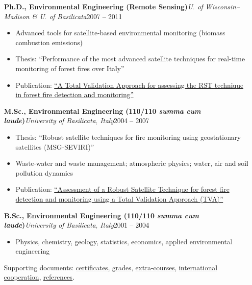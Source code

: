 \documentclass[10pt,a4paper]{article}
\newcommand{\role}[3]{%
  \textbf{#1}\hfill\textcolor{accent}{\textit{#2}}\hfill{#3}\par\vspace{0.15em}}
\begin{document}
\role{Ph.D., Environmental Engineering (Remote Sensing)}{U. of Wisconsin--Madison \& U. of Basilicata}{2007 -- 2011}
\begin{itemize}
\item Advanced tools for satellite-based environmental monitoring (biomass combustion emissions)
\item Thesis: ``Performance of the most advanced satellite techniques for real-time monitoring of forest fires over Italy''
\item Publication: \href{https://www.researchgate.net/publication/234245164_A_Total_Validation_Approach_for_assessing_the_RST_technique_in_forest_fire_detection_and_monitoring}{``A Total Validation Approach for assessing the RST technique in forest fire detection and monitoring''}
\end{itemize}

\role{M.Sc., Environmental Engineering (110/110 \textit{summa cum laude})}{University of Basilicata, Italy}{2004 -- 2007}
\begin{itemize}
\item Thesis: ``Robust satellite techniques for fire monitoring using geostationary satellites (MSG-SEVIRI)''
\item Waste-water and waste management; atmospheric physics; water, air and soil pollution dynamics
\item Publication: \href{https://www.researchgate.net/publication/234055648_Assessment_of_a_Robust_Satellite_Technique_for_forest_fire_detection_and_monitoring_by_using_a_Total_Validation_Approach_TVA}{``Assessment of a Robust Satellite Technique for forest fire detection and monitoring using a Total Validation Approach (TVA)''}
\end{itemize}

\role{B.Sc., Environmental Engineering (110/110 \textit{summa cum laude})}{University of Basilicata, Italy}{2001 -- 2004}
\begin{itemize}
\item Physics, chemistry, geology, statistics, economics, applied environmental engineering
\end{itemize}

\vspace{0.6em}
\small Supporting documents: \href{https://drive.google.com/file/d/1TurHo7zIqE6_efP7Ho0fWwewve0lyJq2/view?usp=sharing}{certificates}, \href{https://drive.google.com/file/d/1QmVIYiWMHVG7rS61SMaESllyqTxkrcRU/view}{grades}, \href{https://drive.google.com/file/d/1D3z3y6sKUg0MaK5rGoZvrykGRFlAcdOk/view?usp=share_link}{extra-courses}, \href{https://drive.google.com/file/d/1KgUw_HTc51RGX6VVkrUTtVh2zfrgpXEz/view?usp=share_link}{international cooperation}, \href{https://drive.google.com/file/d/1dj5vOcAGKw-qrIa63V-UigJ2MN-MjlRj/view}{references}.
\end{document}
